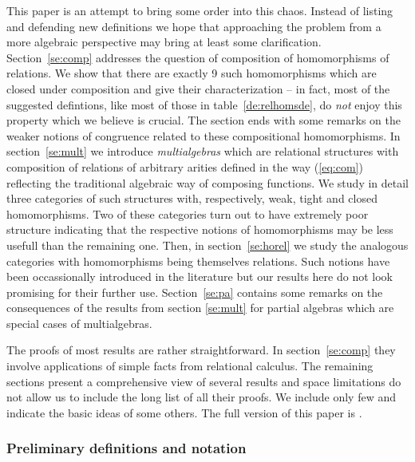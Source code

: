 \documentclass[10pt]{article}
\begin{document}
This paper is an attempt to bring some order into this
chaos. 
Instead of listing and defending new definitions
we hope that approaching the problem from a more algebraic perspective
may bring at least some clarification. 
 Section~\ref{se:comp}
addresses the question of composition of homomorphisms of relations. 
We show that there are exactly 9 such
homomorphisms which are closed under composition and
give their characterization  -- in fact, most of
the suggested defintions, like most of those in
table~\ref{de:relhomsde}, do {\em not} enjoy this property which we
believe is crucial. The section ends with some remarks on the weaker notions
of congruence related to these compositional homomorphisms.
%
In section~\ref{se:mult} we introduce {\em
multialgebras} which are relational structures with composition of
relations of arbitrary arities defined in the way (\ref{eq:com}) 
reflecting the traditional algebraic way of
composing functions.  We study in detail three categories of such structures with, 
respectively, weak, tight and closed homomorphisms. Two of these categories
turn out to have extremely poor structure indicating that the respective
notions of homomorphisms may be less usefull than the remaining one.
Then, in section~\ref{se:horel} we study the analogous
categories with homomorphisms being themselves relations. Such notions have
been occassionally introduced in the literature but our results here  do not 
look promising for their further use.
Section~\ref{se:pa} contains some remarks on
the consequences of the results from section \ref{se:mult} for partial
algebras which are special cases of multialgebras.

The proofs of most results are rather straightforward. In section~\ref{se:comp} 
they involve applications of simple facts from relational calculus. 
The remaining sections present a comprehensive view of several results and
space limitations do not allow us to include the long list of all their proofs.
We include only few and indicate the
basic ideas of some others. The full version of this paper is \cite{BW97}.

\subsubsection*{Preliminary definitions and notation}
\end{document}
